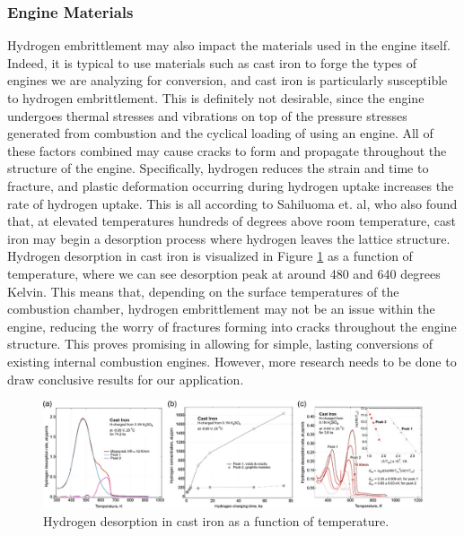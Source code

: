 \documentclass[conf]{new-aiaa}
\begin{document}
\subsubsection{Engine Materials}
Hydrogen embrittlement may also impact the materials used in the engine itself. Indeed, it is typical to use materials such as cast iron to forge the types of engines we are analyzing for conversion, and cast iron is particularly susceptible to hydrogen embrittlement. This is definitely not desirable, since the engine undergoes thermal stresses and vibrations on top of the pressure stresses generated from combustion and the cyclical loading of using an engine. All of these factors combined may cause cracks to form and propagate throughout the structure of the engine. Specifically, hydrogen reduces the strain and time to fracture, and plastic deformation occurring during hydrogen uptake increases the rate of hydrogen uptake. This is all according to Sahiluoma et. al, who also found that, at elevated temperatures hundreds of degrees above room temperature, cast iron may begin a desorption process where hydrogen leaves the lattice structure.\cite{Hydrogen_embrittlement_of_nodular_cast_iron} Hydrogen desorption in cast iron is visualized in Figure \ref{fig:cast_iron} as a function of temperature, where we can see desorption peak at around 480 and 640 degrees Kelvin. This means that, depending on the surface temperatures of the combustion chamber, hydrogen embrittlement may not be an issue within the engine, reducing the worry of fractures forming into cracks throughout the engine structure. This proves promising in allowing for simple, lasting conversions of existing internal combustion engines. However, more research needs to be done to draw conclusive results for our application.

\begin{figure}[H]
    \centering
    \includegraphics[width=1\textwidth]{Figures/desorpt.jpg}
    \caption{Hydrogen desorption in cast iron as a function of temperature.\cite{owidco2andgreenhousegasemissions:by_sector}}
    \label{fig:cast_iron}
\end{figure}
\end{document}
